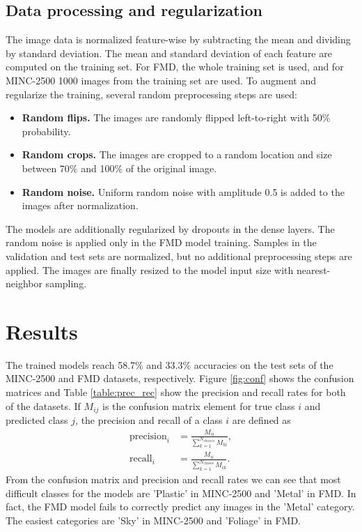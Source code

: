 \documentclass[12pt,a4paper]{article}
\begin{document}
	
	\subsection{Data processing and regularization}
	
	The image data is normalized feature-wise by subtracting the mean and dividing by standard deviation. The mean and standard deviation of each feature are computed on the training set. For FMD, the whole training set is used, and for MINC-2500 1000 images from the training set are used. To augment and regularize the training, several random preprocessing steps are used:
	
	\begin{itemize}
		
		\item \textbf{Random flips.} The images are randomly flipped left-to-right with 50\% probability.
		
		\item \textbf{Random crops.}
			The images are cropped to a random location and size between 70\% and 100\% of the original image.
			
		\item \textbf{Random noise.} Uniform random noise with amplitude 0.5 is added to the images after normalization. 
		
	\end{itemize}
	
	\noindent
	The models are additionally regularized by dropouts \cite{srivastava_2014} in the dense layers. The random noise is applied only in the FMD model training. Samples in the validation and test sets are normalized, but no additional preprocessing steps are applied. The images are finally resized to the model input size with nearest-neighbor sampling.
	
	\section{Results}
	
	The trained models reach 58.7\% and 33.3\% accuracies on the test sets of the MINC-2500 and FMD datasets, respectively. Figure \ref{fig:conf} shows the confusion matrices and Table \ref{table:prec_rec} show the precision and recall rates for both of the datasets. If $M_{ij}$ is the confusion matrix element for true class $i$ and predicted class $j$, the precision and recall of a class $i$ are defined as
	\begin{align}
		\mathrm{precision}_i &= \frac{M_{ii}}{\sum_{k=1}^{N_{classes}} M_{ki}}, \\
		\mathrm{recall}_i &= \frac{M_{ii}}{\sum_{k=1}^{N_{\mathrm{classes}}} M_{ik}}.
	\end{align}
	From the confusion matrix and precision and recall rates we can see that most difficult classes for the models are 'Plastic' in MINC-2500 and 'Metal' in FMD. In fact, the FMD model fails to correctly predict any images in the 'Metal' category. The easiest categories are 'Sky' in MINC-2500 and 'Foliage' in FMD.
	
\end{document}
